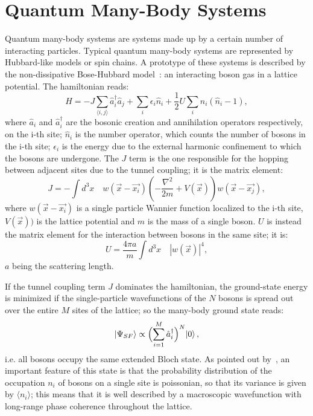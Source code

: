 
\section{Quantum Many-Body Systems}
Quantum many-body systems are systems made up by a certain number of interacting particles. Typical quantum many-body systems are represented by Hubbard-like models or spin chains. 
A prototype of these systems is described by the non-dissipative Bose-Hubbard model~\cite{Greiner_bose_hubbard}: an interacting boson gas in a lattice potential. The hamiltonian reads:
\begin{equation}
    H = -J\sum_{\langle i,j \rangle} \hat{a}^{\dagger}_i \hat{a}_j + \sum_i \epsilon_i \hat{n}_i+ \frac{1}{2} U \sum_i \hat{n}_i(\hat{n}_i -1 ),
\end{equation}
where $\hat{a}_i$ and $\hat{a}^{\dagger}_i$ are the bosonic creation and annihilation operators respectively, on the i-th site; $\hat{n}_i$ is the number operator, which counts the number of bosons in the i-th site; $\epsilon_i$ is the energy due to the external harmonic confinement to which the bosons are undergone. The $J$ term is the one responsible for the hopping between adjacent sites due to the tunnel coupling; it is the matrix element:
\begin{equation*}
    J = -\int d^3x \quad w(\Vec{x}-\Vec{x_i})(-\frac{\nabla^2}{2m}+V(\Vec{x}))w(\Vec{x}-\Vec{x_j}),
\end{equation*}
where $w(\Vec{x}-\Vec{x_i})$ is a single particle Wannier function localized to the i-th site, $V(\Vec{x}))$ is the lattice potential and $m$ is the mass of a single boson.
$U$ is instead the matrix element for the interaction between bosons in the same site; it is:
\begin{equation*}
    U = \frac{4\pi a}{m} \int d^3x \quad |w(\Vec{x})|^4, 
\end{equation*}
$a$ being the scattering length. 

If the tunnel coupling term $J$ dominates the hamiltonian, the ground-state energy is minimized if the single-particle wavefunctions of the $N$ bosons is spread out over the entire $M$ sites of the lattice; so the many-body ground state reads:
\begin{equation*}
    \ket{\Psi_{SF}} \propto \Bigl( \sum_{i=1}^M \hat{a}^{\dagger}_i \Bigl)^N \ket{0},
\end{equation*}
i.e. all bosons occupy the same extended Bloch state. As pointed out by~\cite{Greiner_bose_hubbard}, an important feature of this state is that the probability distribution of the occupation $n_i$ of bosons on a single site is poissonian, so that its variance is given by $\langle n_i \rangle$; this means that it is well described by a macroscopic wavefunction with long-range phase coherence throughout the lattice.

